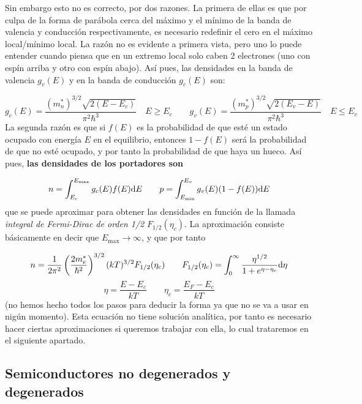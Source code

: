 Sin embargo esto no es correcto, por dos razones. La primera de ellas es que por culpa de la forma de parábola cerca del máximo y el mínimo de la banda de valencia y conducción respectivamente, es necesario redefinir el cero en el máximo local/mínimo local. La razón no es evidente a primera vista, pero uno lo puede entender cuando piensa que en un extremo local solo caben 2 electrones (uno con espín arriba y otro con espín abajo). Así pues, las densidades en la banda de valencia $g_v(E)$ y en la banda de conducción $g_c(E)$ son:

\begin{equation}
	g_c(E) = \frac{(m_n^*)^{3/2} \sqrt{2(E-E_c)}}{\pi^2 \hbar^3} \quad E \geq E_c \qquad 	g_v(E) = \frac{(m_p^*)^{3/2} \sqrt{2(E_v-E)}}{\pi^2 \hbar^3} \quad E \leq E_v
\end{equation}
La segunda razón es que si $f(E)$ es la probabilidad de que esté un estado ocupado con energía $E$ en el equilibrio, entonces $1-f(E)$ será la probabilidad de que no esté ocupado, y por tanto la probabilidad de que haya un hueco. Así pues, \textbf{las densidades de los portadores son}

\begin{equation}
	n=\int_{E_c}^{E_{\max}} g_c(E)f(E)\mathrm{d} E \qquad p = \int_{E_{\min}}^{E_v} g_v(E) (1-f(E))\mathrm{d} E
\end{equation}
que se puede aproximar para obtener las densidades en función de la llamada \textit{integral de Fermi-Dirac de orden 1/2} $F_{1/2}(\eta_c)$. La aproximación consiste básicamente en decir que $E_{\max} \rightarrow \infty$, y que por tanto

\begin{equation}
	n = \frac{1}{2\pi^2} \left( \frac{2m_e^*}{\hbar^2} \right)^{3/2} (kT)^{3/2} F_{1/2}(\eta_c) \qquad F_{1/2}(\eta_c) = \int_0^\infty \frac{\eta^{1/2}}{1+e^{\eta-\eta_c}}\mathrm{d} \eta
\end{equation}
\begin{equation}
	\eta=\frac{E-E_c}{kT} \qquad \eta_c= \frac{E_F-E_c}{kT}
\end{equation}
(no hemos hecho todos los pasos para deducir la forma ya que no se va a usar en nigún momento).
Esta ecuación no tiene solución analítica, por tanto es necesario hacer ciertas aproximaciones si queremos trabajar con ella, lo cual trataremos en el siguiente apartado.

\subsection{Semiconductores no degenerados y degenerados}

